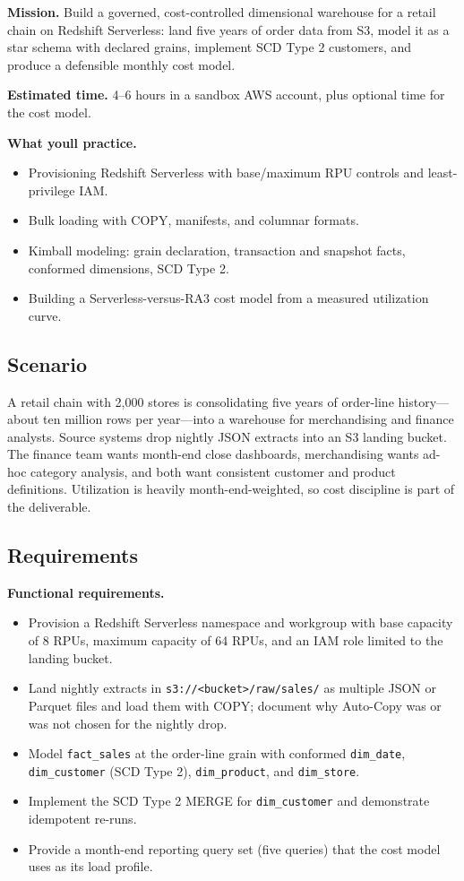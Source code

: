 \begin{capstonebox}
\textbf{Mission.} Build a governed, cost-controlled dimensional warehouse for a retail chain on Redshift Serverless: land five years of order data from S3, model it as a star schema with declared grains, implement SCD Type 2 customers, and produce a defensible monthly cost model.

\textbf{Estimated time.} 4--6 hours in a sandbox AWS account, plus optional time for the cost model.

\textbf{What you\textquotesingle{}ll practice.}
\begin{itemize}
    \item Provisioning Redshift Serverless with base/maximum RPU controls and least-privilege IAM.
    \item Bulk loading with COPY, manifests, and columnar formats.
    \item Kimball modeling: grain declaration, transaction and snapshot facts, conformed dimensions, SCD Type 2.
    \item Building a Serverless-versus-RA3 cost model from a measured utilization curve.
\end{itemize}
\end{capstonebox}

\subsection*{Scenario}
A retail chain with 2{,}000 stores is consolidating five years of order-line history---about ten million rows per year---into a warehouse for merchandising and finance analysts. Source systems drop nightly JSON extracts into an S3 landing bucket. The finance team wants month-end close dashboards, merchandising wants ad-hoc category analysis, and both want consistent customer and product definitions. Utilization is heavily month-end-weighted, so cost discipline is part of the deliverable.

\subsection*{Requirements}
\textbf{Functional requirements.}
\begin{itemize}
    \item Provision a Redshift Serverless namespace and workgroup with base capacity of 8 RPUs, maximum capacity of 64 RPUs, and an IAM role limited to the landing bucket.
    \item Land nightly extracts in \texttt{s3://<bucket>/raw/sales/} as multiple JSON or Parquet files and load them with COPY; document why Auto-Copy was or was not chosen for the nightly drop.
    \item Model \texttt{fact\_sales} at the order-line grain with conformed \texttt{dim\_date}, \texttt{dim\_customer} (SCD Type 2), \texttt{dim\_product}, and \texttt{dim\_store}.
    \item Implement the SCD Type 2 MERGE for \texttt{dim\_customer} and demonstrate idempotent re-runs.
    \item Provide a month-end reporting query set (five queries) that the cost model uses as its load profile.
\end{itemize}

